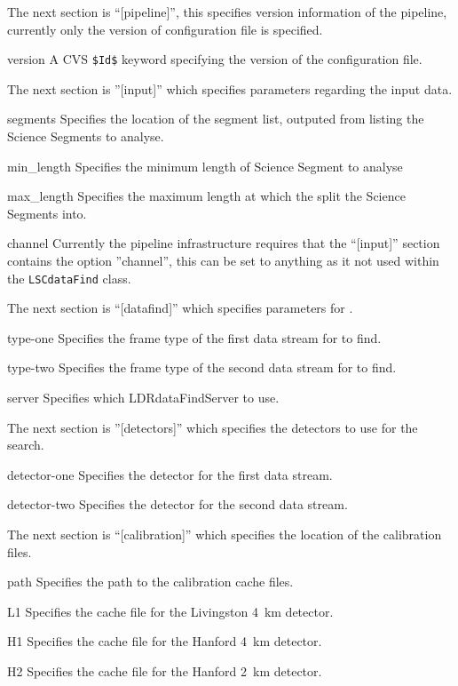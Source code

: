\begin{entry}
The next section is ``[pipeline]'', this specifies version information
of the pipeline, currently only the version of configuration file is
specified.
\begin{entry}
\item[version]
A CVS \texttt{\$Id\$} keyword specifying the version of the
configuration file.
\end{entry}

The next section is ''[input]'' which specifies parameters regarding
the input data.
\begin{entry}
\item[segments]
Specifies the location of the segment list, outputed from
 listing the Science Segments to analyse.
\item[min\_length]
Specifies the minimum length of Science Segment to analyse
\item[max\_length]
Specifies the maximum length at which the split the Science Segments
into.
\item[channel]
Currently the pipeline infrastructure requires that the ``[input]''
section contains the option ''channel'', this can be set to anything as
it not used within the \texttt{LSCdataFind} class.
\end{entry}

The next section is ``[datafind]'' which specifies parameters for
.
\begin{entry}
\item[type-one]
Specifies the frame type of the first data stream for 
to find.
\item[type-two]
Specifies the frame type of the second data stream for
 to find.
\item[server]
Specifies which LDRdataFindServer to use.
\end{entry}

The next section is ''[detectors]'' which specifies the detectors to use
for the search.
\begin{entry}
\item[detector-one]
Specifies the detector for the first data stream.
\item[detector-two]
Specifies the detector for the second data stream.
\end{entry}

The next section is ``[calibration]'' which specifies the location of
the calibration files.
\begin{entry}
\item[path]
Specifies the path to the calibration cache files.
\item[L1]
Specifies the cache file for the Livingston 4~km detector.
\item[H1]
Specifies the cache file for the Hanford 4~km detector.
\item[H2]
Specifies the cache file for the Hanford 2~km detector.
\end{entry}


\end{entry}
